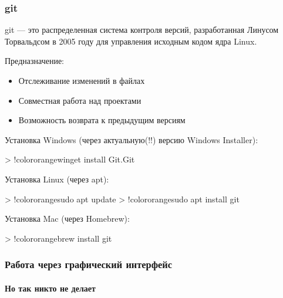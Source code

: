 \documentclass[9pt, aspectratio=1610]{beamer}
\begin{document}
\begin{frame}[fragile]\frametitle{git}
	
	\begin{alertblock}{git ---}
		это распределенная система контроля версий, разработанная Линусом Торвальдсом в 2005 году для управления исходным кодом ядра Linux.
	\end{alertblock}
	
	Предназначение:
	
	\begin{itemize}
		\item Отслеживание изменений в файлах
		\item Совместная работа над проектами
		\item Возможность возврата к предыдущим версиям
	\end{itemize}
	
	Установка Windows (через актуальную(!!) версию Windows Installer):
	
	\begin{VerbatimCmd}[]
				
		> !color{orange}winget install Git.Git		
			
	\end{VerbatimCmd}
	
	Установка Linux (через apt):
	
	\begin{VerbatimCmd}[commandchars=!\{\},gobble=2]
				
		> !color{orange}sudo apt update
		> !color{orange}sudo apt install git	
					
	\end{VerbatimCmd}
	
	Установка Mac (через Homebrew):
	
	\begin{VerbatimCmd}[commandchars=!\{\},gobble=2]
		
		> !color{orange}brew install git	
		
	\end{VerbatimCmd}
	
	
\end{frame}

\begin{frame}\frametitle{Работа через графический интерфейс}\framesubtitle{Но так никто не делает}
	
	\centering{}
	
	
\end{frame}
\end{document}
